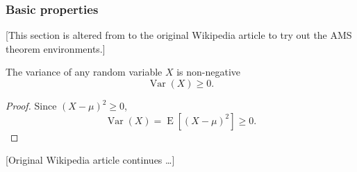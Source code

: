 \subsubsection{Basic properties}\label{basic_properties}

[This section is altered from to the original Wikipedia
  article to try out the AMS theorem environments.]

\begin{theorem}
  The variance  of any random variable $X$ is non-negative
  $$\operatorname{Var}(X)\ge 0.$$
\end{theorem}

\begin{proof}
  Since $(X - \mu)^2 \geq 0$,
  \[\operatorname{Var}(X) = \operatorname{E}\left[(X - \mu)^2\right] \geq 0.\]
\end{proof}

[Original Wikipedia article continues \ldots]
